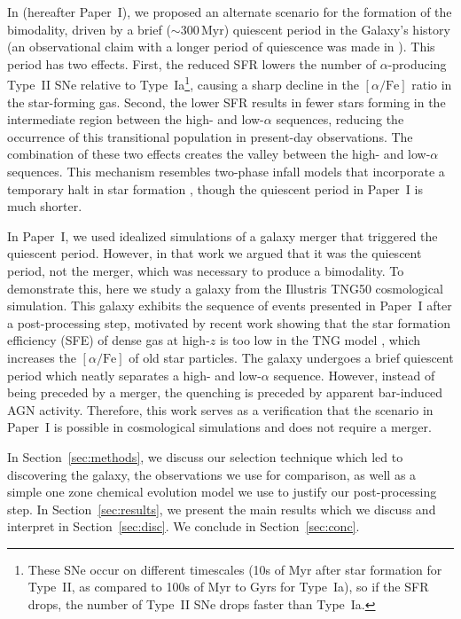 \documentclass[twocolumn,linenumbers]{aastex631}
\newcommand{\Myr}{\ensuremath{\textrm{Myr}}}
\newcommand{\alphaFe}{\ensuremath{[\alpha/\textrm{Fe}]}}
\begin{document}
In \citet{2024arXiv240707985B} (hereafter Paper~I), we proposed an alternate scenario for the formation of the bimodality, driven by a brief ($\sim300\,\Myr$) quiescent period in the Galaxy's history (an observational claim with a longer period of quiescence was made in \citet{2016A&A...589A..66H}). This period has two effects. First, the reduced SFR lowers the number of $\alpha$-producing Type~II SNe relative to Type~Ia\footnote{These SNe occur on different timescales (10s of Myr after star formation for Type~II, as compared to 100s of Myr to Gyrs for Type~Ia), so if the SFR drops, the number of Type~II SNe drops faster than Type~Ia.}, causing a sharp decline in the \alphaFe{} ratio in the star-forming gas. Second, the lower SFR results in fewer stars forming in the intermediate region between the high- and low-$\alpha$ sequences, reducing the occurrence of this transitional population in present-day observations. The combination of these two effects creates the valley between the high- and low-$\alpha$ sequences. This mechanism resembles two-phase infall models that incorporate a temporary halt in star formation \citep[][and references therein]{2024arXiv240511025S}, though the quiescent period in Paper~I is much shorter.

In Paper~I, we used idealized simulations of a galaxy merger that triggered the quiescent period. However, in that work we argued that it was the quiescent period, not the merger, which was necessary to produce a bimodality. To demonstrate this, here we study a galaxy from the Illustris TNG50 cosmological simulation. This galaxy exhibits the sequence of events presented in Paper~I after a post-processing step, motivated by recent work showing that the star formation efficiency (SFE) of dense gas at high-$z$ is too low in the TNG model \citep{2024arXiv240909121H}, which increases the \alphaFe{} of old star particles. The galaxy undergoes a brief quiescent period which neatly separates a high- and low-$\alpha$ sequence. However, instead of being preceded by a merger, the quenching is preceded by apparent bar-induced AGN activity. Therefore, this work serves as a verification that the scenario in Paper~I is possible in cosmological simulations and does not require a merger.

In Section~\ref{sec:methods}, we discuss our selection technique which led to discovering the galaxy, the observations we use for comparison, as well as a simple one zone chemical evolution model we use to justify our post-processing step. In Section~\ref{sec:results}, we present the main results which we discuss and interpret in Section~\ref{sec:disc}. We conclude in Section~\ref{sec:conc}.
\end{document}
